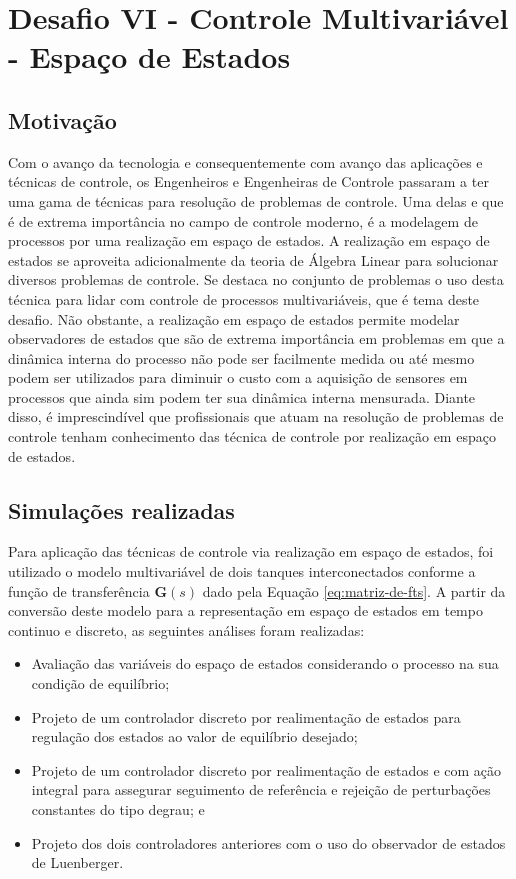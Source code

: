 \section{Desafio VI - Controle Multivariável - Espaço de Estados}

\subsection{Motivação}

Com o avanço da tecnologia e consequentemente com avanço das aplicações e
técnicas de controle, os Engenheiros e Engenheiras de Controle passaram a ter
uma gama de técnicas para resolução de problemas de controle. Uma delas e que é
de extrema importância no campo de controle moderno, é a modelagem de processos
por uma realização em espaço de estados. A realização em espaço de estados se
aproveita adicionalmente da teoria de Álgebra Linear para solucionar diversos
problemas de controle. Se destaca no conjunto de problemas o uso desta técnica
para lidar com controle de processos multivariáveis, que é tema deste desafio.
Não obstante, a realização em espaço de estados permite modelar observadores de
estados que são de extrema importância em problemas em que a dinâmica interna do
processo não pode ser facilmente medida ou até mesmo podem ser utilizados para
diminuir o custo com a aquisição de sensores em processos que ainda sim podem
ter sua dinâmica interna mensurada. Diante disso, é imprescindível que
profissionais que atuam na resolução de problemas de controle tenham
conhecimento das técnica de controle por realização em espaço de estados.  

\subsection{Simulações realizadas}

Para aplicação das técnicas de controle via realização em espaço de estados, foi
utilizado o modelo multivariável de dois tanques interconectados conforme a
função de transferência $\mathbf{G}(s)$ dado pela Equação
\ref{eq:matriz-de-fts}. A partir da conversão deste modelo para a representação
em espaço de estados em tempo continuo e discreto, as seguintes análises foram
realizadas:

\begin{itemize}
    \item Avaliação das variáveis do espaço de estados considerando o processo
    na sua condição de equilíbrio;
    \item Projeto de um controlador discreto por realimentação de estados para
    regulação dos estados ao valor de equilíbrio desejado;
    \item Projeto de um controlador discreto por realimentação de estados e com
    ação integral para assegurar seguimento de referência e rejeição de
    perturbações constantes do tipo degrau; e
    \item Projeto dos dois controladores anteriores com o uso do observador de
    estados de Luenberger.
\end{itemize}

